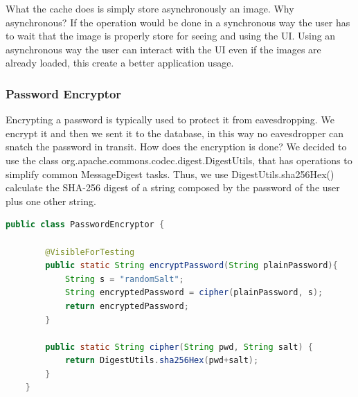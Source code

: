 What the cache does is simply store asynchronously an image. Why asynchronous? If the operation would be done in a synchronous way the user has to wait that the image is properly store for seeing and using the UI. Using an asynchronous way the user can interact with the UI even if the images are already loaded, this create a better application usage.
\subsubsection{Password Encryptor}
Encrypting a password is typically used to protect it from eavesdropping. We encrypt it and then we sent it to the database, in this way no eavesdropper can snatch the password in transit.
How does the encryption is done? We decided to use the class org.apache.commons.codec.digest.DigestUtils, that has operations to simplify common MessageDigest tasks. Thus, we use DigestUtils.sha256Hex() calculate the SHA-256 digest of a string composed by the password of the user plus one other string.

\begin{lstlisting}[language=Java]
	public class PasswordEncryptor {
		
		@VisibleForTesting
		public static String encryptPassword(String plainPassword){
			String s = "randomSalt";
			String encryptedPassword = cipher(plainPassword, s);
			return encryptedPassword;
		}
		
		public static String cipher(String pwd, String salt) {
			return DigestUtils.sha256Hex(pwd+salt);
		}
	}
\end{lstlisting}
